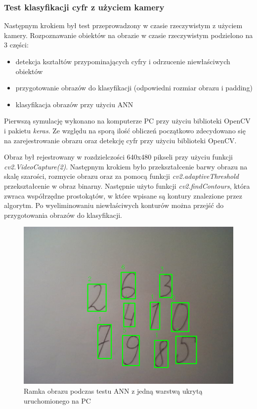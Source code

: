 \subsubsection{Test klasyfikacji cyfr z użyciem kamery}

Następnym krokiem był test przeprowadzony w czasie rzeczywistym z użyciem kamery. Rozpoznawanie obiektów na obrazie w czasie rzeczywistym podzielono na 3 części:
\begin{itemize}
    \item detekcja kształtów przypominających cyfry i odrzucenie niewłaściwych obiektów
    \item przygotowanie obrazów do klasyfikacji (odpowiedni rozmiar obrazu i padding)
    \item klasyfikacja obrazów przy użyciu ANN
\end{itemize}

Pierwszą symulację wykonano na komputerze PC przy użyciu biblioteki OpenCV i pakietu \emph{keras}.
Ze względu na sporą ilość obliczeń początkowo zdecydowano się na zarejestrowanie obrazu oraz detekcję cyfr przy użyciu biblioteki OpenCV. 

Obraz był rejestrowany w rozdzielczości 640x480 pikseli przy użyciu funkcji  \emph{cv2.VideoCapture(2)}. Następnym krokiem było przekształcenie barwy obrazu na skalę szarości, rozmycie obrazu oraz za pomocą funkcji \emph{cv2.adaptiveThreshold} przekształcenie w obraz binarny. Następnie użyto funkcji \emph{cv2.findContours}, która zwraca współrzędne prostokątów, w które wpisane są kontury znalezione przez algorytm. Po wyeliminowaniu niewłaściwych konturów można przejść do przygotowania obrazów do klasyfikacji. 

\begin{figure}[!h]
    \centering
    \includegraphics[width=\textwidth]{img/1hid-layer-pc-img.png}
    \caption{Ramka obrazu podczas testu ANN z jedną warstwą ukrytą uruchomionego na PC}
    \label{1hid-layer-pc-img}
  \end{figure}

